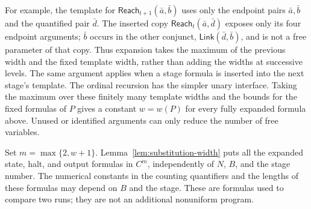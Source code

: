 For example, the template for $\mathsf{Reach}_{t+1}(\bar a,\bar b)$
uses only the endpoint pairs $\bar a,\bar b$ and the quantified pair
$\bar d$. The inserted copy $\mathsf{Reach}_t(\bar a,\bar d)$ exposes
only its four endpoint arguments; $\bar b$ occurs in the other conjunct,
$\mathsf{Link}(\bar d,\bar b)$, and is not a free parameter of that
copy. Thus expansion takes the maximum of the previous width and the
fixed template width, rather than adding the widths at successive
levels. The same argument applies when a stage formula is inserted into
the next stage's template. The ordinal recursion has the simpler unary
interface. Taking the maximum over these finitely many template widths
and the bounds for the fixed formulas of $P$ gives a constant $w=w(P)$
for every fully expanded formula above. Unused or identified arguments
can only reduce the number of free variables.

Set $m=\max\{2,w+1\}$. Lemma~\ref{lem:substitution-width} puts all the
expanded state, halt, and output formulas in $C^m$, independently of
$N$, $B$, and the stage number. The numerical constants in the counting
quantifiers and the lengths of these formulas may depend on $B$ and the
stage. These are formulas used to compare two runs; they are not an
additional nonuniform program.
